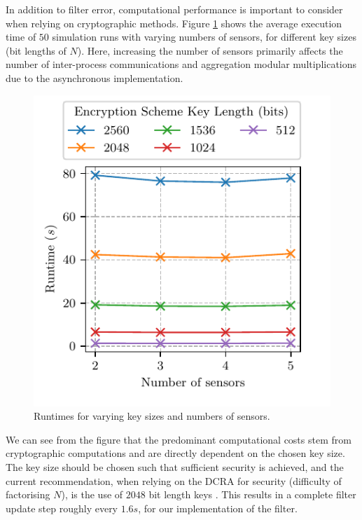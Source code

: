 \documentclass[10pt,letterpaper,oneside,twocolumn,journal]{IEEEtran}
\theoremstyle{definition}
\theoremstyle{definition}
\theoremstyle{remark}
\begin{document}
In addition to filter error, computational performance is important to consider when relying on cryptographic methods. Figure \ref{fig:sim_timing} shows the average execution time of $50$ simulation runs with varying numbers of sensors, for different key sizes (bit lengths of $N$). Here, increasing the number of sensors primarily affects the number of inter-process communications and aggregation modular multiplications due to the asynchronous implementation.
\begin{figure}[htbp]
    \centering
    \includegraphics{images/timing.pdf}
    \caption{Runtimes for varying key sizes and numbers of sensors.}
    \label{fig:sim_timing}
\end{figure}
We can see from the figure that the predominant computational costs stem from cryptographic computations and are directly dependent on the chosen key size. The key size should be chosen such that sufficient security is achieved, and the current recommendation, when relying on the DCRA for security (difficulty of factorising $N$), is the use of $2048$ bit length keys \cite{barkerRecommendationPairwiseKey2019}. This results in a complete filter update step roughly every $1.6s$, for our implementation of the filter.

% 
%                                               
%                                               
%                                               
% 
\end{document}

